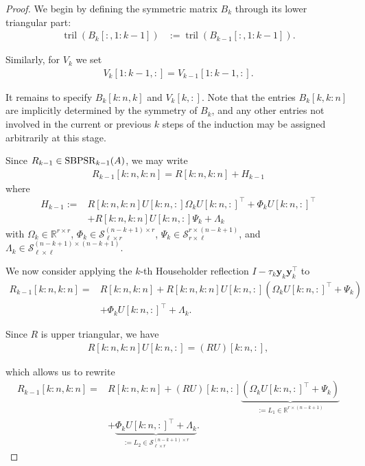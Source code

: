 \documentclass[a4paper,fleqn]{cas-sc}
\def\calS{{\mathcal S}}
\def\bfy{{\mathbf y}}
\DeclareMathOperator{\tril}{tril}
\begin{document}
\begin{proof}
    We begin by defining the symmetric matrix $B_k$ through its lower triangular part:
    \begin{align*}
    \tril (B_k[:,1\!:\!k-1]) &:= \tril (B_{k-1}[:,1\!:\!k-1]). 
    \end{align*}

    Similarly, for $V_k$ we set
    \begin{align*}
        V_k[1:k-1,:] = V_{k-1}[1:k-1,:].
    \end{align*}

    It remains to specify $B_k[k:n,k]$ and $V_k[k,:]$. Note that the entries $B_k[k, k:n]$ are implicitly determined by the symmetry of $B_k$, and any other entries not involved in the current or previous $k$ steps of the induction may be assigned arbitrarily at this stage.

    Since $R_{k-1}  \in {\rm SBPSR}_{k-1}(A)$, we may write
    \begin{align*}
        R_{k-1}[k:n,k:n] = R[k:n,k:n] + H_{k-1}
    \end{align*}
    where
    \begin{align*}
        H_{k-1} := &R[k:n,k:n]U[k:n,:]\Omega_k U[k:n,:]^\top + \Phi_k U[k:n,:]^\top \\&+ R[k:n,k:n]U[k:n,:]\Psi_k + \Lambda_k
    \end{align*}
    with $\Omega_k \in \mathbb R^{r\times r}$, $\Phi_k \in \calS^{(n-k+1)\times r}_{\ell \times r}$, $\Psi_k\in \calS^{r\times(n-k+1)}_{r\times \ell}$, and $\Lambda_k\in \calS^{(n-k+1)\times(n-k+1)}_{\ell \times \ell}$.
    
    We now consider applying the $k$-th Householder reflection $I-\tau_k\bfy_k \bfy_k^\top$ to 
    \begin{align*}
        R_{k-1}[k:n,k:n] =& R[k:n,k:n] + R[k:n,k:n]U[k:n,:](\Omega_k U[k:n,:]^\top + \Psi_k) \\& + \Phi_k U[k:n,:]^\top + \Lambda_k.
    \end{align*}

    Since $R$ is upper triangular, we have
    \begin{align*}
        R[k:n,k:n]U[k:n,:] = (RU)[k:n,:],
    \end{align*}

    which allows us to rewrite
    \begin{align*}
        R_{k-1}[k:n,k:n] =& R[k:n,k:n] + (RU)[k:n,:]\underbrace{(\Omega_k U[k:n,:]^\top + \Psi_k)}_{:=L_1\in \mathbb R^{r\times(n-k+1)}} \\& + \underbrace{\Phi_kU[k:n,:]^\top + \Lambda_k}_{:=L_2\in \calS^{(n-k+1)\times r}_{\ell \times r}}.
    \end{align*}


\end{proof}
\end{document}
